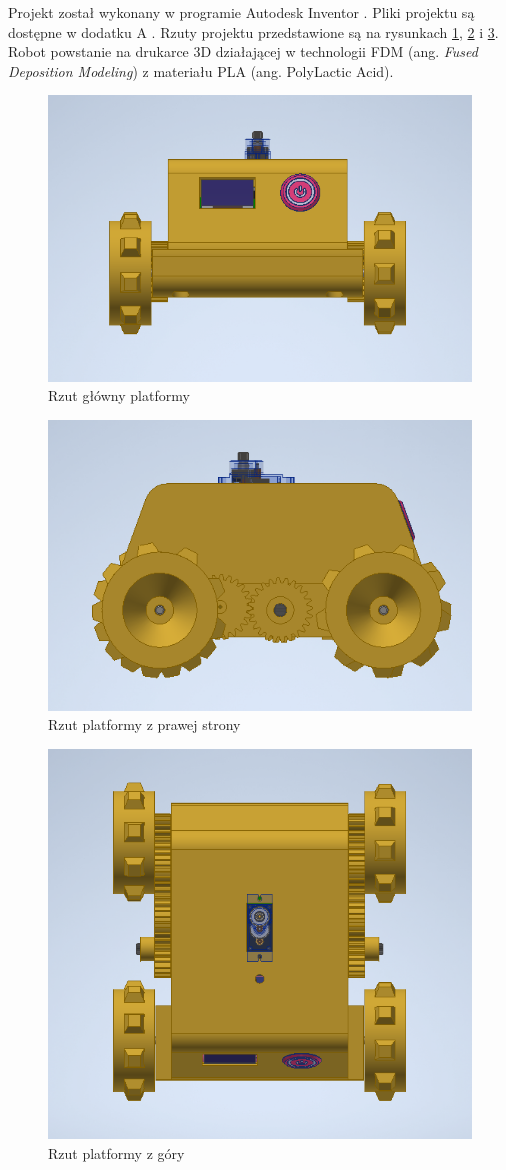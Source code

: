Projekt został wykonany w programie Autodesk Inventor \cite{inventor}. Pliki projektu są dostępne w dodatku A \label{sec:disc-addon}. Rzuty projektu przedstawione są na rysunkach \ref{fig:view1}, \ref{fig:view2} i \ref{fig:view3}. Robot powstanie na drukarce 3D działającej w technologii FDM (ang. \emph{Fused Deposition Modeling}) z materiału PLA (ang. PolyLactic Acid).

\begin{figure}[H]
	\centering
		\includegraphics[width=0.6\linewidth]{rys/view1.png}
	\caption{Rzut główny platformy}
	\label{fig:view1}
\end{figure}

\begin{figure}[H]
	\centering
		\includegraphics[width=0.6\linewidth]{rys/view2.png}
	\caption{Rzut platformy z prawej strony}
	\label{fig:view2}
\end{figure}

\begin{figure}[H]
	\centering
		\includegraphics[width=0.6\linewidth]{rys/view3.png}
	\caption{Rzut platformy z góry}
	\label{fig:view3}
\end{figure}

